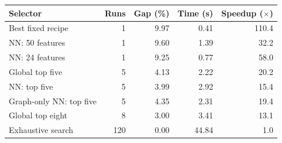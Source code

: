 \begin{tabular}{@{}lrrrr@{}}
\toprule
\textbf{Selector} & \textbf{Runs} & \textbf{Gap (\%)} & \textbf{Time (s)} & \textbf{Speedup ($\times$)} \\
\midrule
Best fixed recipe & 1 & 9.97 & 0.41 & 110.4 \\
NN: 50 features & 1 & 9.60 & 1.39 & 32.2 \\
NN: 24 features & 1 & 9.25 & 0.77 & 58.0 \\
Global top five & 5 & 4.13 & 2.22 & 20.2 \\
NN: top five & 5 & 3.99 & 2.92 & 15.4 \\
Graph-only NN: top five & 5 & 4.35 & 2.31 & 19.4 \\
Global top eight & 8 & 3.00 & 3.41 & 13.1 \\
Exhaustive search & 120 & 0.00 & 44.84 & 1.0 \\
\bottomrule
\end{tabular}

